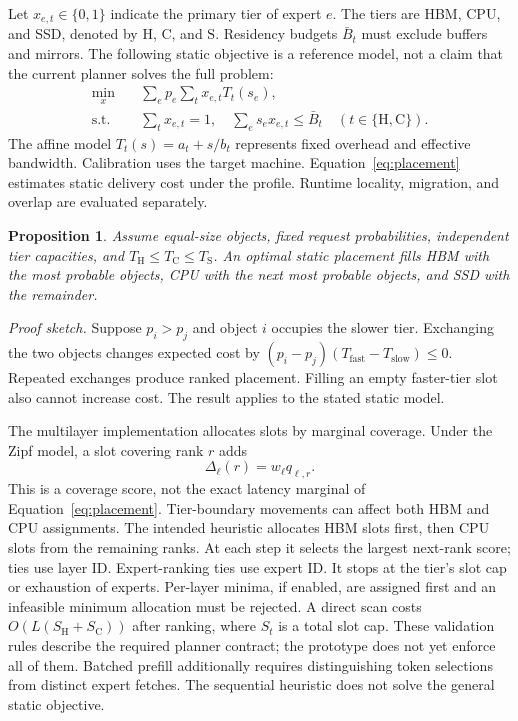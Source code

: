 \documentclass[conference,9pt,letterpaper]{IEEEtran}
\newtheorem{proposition}{Proposition}
\begin{document}
Let $x_{e,t}\in\{0,1\}$ indicate the primary tier of expert $e$. The tiers are HBM, CPU, and SSD, denoted by $\mathrm H$, $\mathrm C$, and $\mathrm S$. Residency budgets $\bar B_t$ must exclude buffers and mirrors. The following static objective is a reference model, not a claim that the current planner solves the full problem:
\begin{align}
 \min_x\quad &\sum_e p_e\sum_t x_{e,t}T_t(s_e),\label{eq:placement}\\
 \text{s.t.}\quad&\sum_t x_{e,t}=1,\quad
 \sum_e s_e x_{e,t}\le \bar B_t\quad(t\in\{\mathrm H,\mathrm C\}).\nonumber
\end{align}
The affine model $T_t(s)=a_t+s/b_t$ represents fixed overhead and effective bandwidth. Calibration uses the target machine. Equation~\ref{eq:placement} estimates static delivery cost under the profile. Runtime locality, migration, and overlap are evaluated separately.

\begin{proposition}
Assume equal-size objects, fixed request probabilities, independent tier capacities, and $T_{\mathrm H}\le T_{\mathrm C}\le T_{\mathrm S}$. An optimal static placement fills HBM with the most probable objects, CPU with the next most probable objects, and SSD with the remainder.
\end{proposition}
\noindent\emph{Proof sketch.} Suppose $p_i>p_j$ and object $i$ occupies the slower tier. Exchanging the two objects changes expected cost by $(p_i-p_j)(T_{\mathrm{fast}}-T_{\mathrm{slow}})\le0$. Repeated exchanges produce ranked placement. Filling an empty faster-tier slot also cannot increase cost. The result applies to the stated static model.

The multilayer implementation allocates slots by marginal coverage. Under the Zipf model, a slot covering rank $r$ adds
\begin{equation}
 \Delta_{\ell}(r)=w_\ell q_{\ell,r}.
\end{equation}
This is a coverage score, not the exact latency marginal of Equation~\ref{eq:placement}. Tier-boundary movements can affect both HBM and CPU assignments. The intended heuristic allocates HBM slots first, then CPU slots from the remaining ranks. At each step it selects the largest next-rank score; ties use layer ID. Expert-ranking ties use expert ID. It stops at the tier's slot cap or exhaustion of experts. Per-layer minima, if enabled, are assigned first and an infeasible minimum allocation must be rejected. A direct scan costs $O(L(S_{\mathrm H}+S_{\mathrm C}))$ after ranking, where $S_t$ is a total slot cap. These validation rules describe the required planner contract; the prototype does not yet enforce all of them. Batched prefill additionally requires distinguishing token selections from distinct expert fetches. The sequential heuristic does not solve the general static objective.
\end{document}
